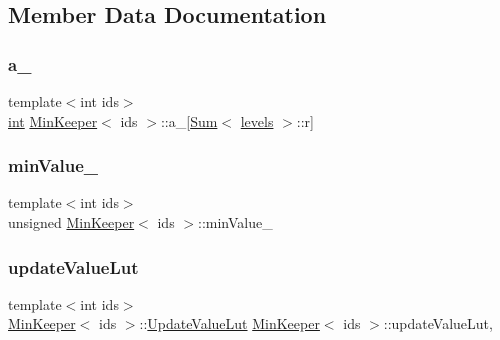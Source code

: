 \subsection{Member Data Documentation}
\mbox{\label{classMinKeeper_ac5ddfd149ad4ff5b944a98ccf4b1e6cd}} 
\subsubsection{\texorpdfstring{a\+\_\+}{a\_}}
{\footnotesize\ttfamily template$<$int ids$>$ \\
\hyperlink{ioapi_8h_a787fa3cf048117ba7123753c1e74fcd6}{int} \hyperlink{classMinKeeper}{Min\+Keeper}$<$ ids $>$\+::a\+\_\+\mbox{[}\hyperlink{structMinKeeper_1_1Sum}{Sum}$<$ \hyperlink{classMinKeeper_a745fcad4766af72248c4f26e8fb5b754aea945fa5cad053f00154ef3bf621ea51}{levels} $>$\+::r\mbox{]}\hspace{0.3cm}{\ttfamily [private]}}

\mbox{\label{classMinKeeper_a5701ef91dc989316dfa7992c19b03ca9}} 
\subsubsection{\texorpdfstring{min\+Value\+\_\+}{minValue\_}}
{\footnotesize\ttfamily template$<$int ids$>$ \\
unsigned \hyperlink{classMinKeeper}{Min\+Keeper}$<$ ids $>$\+::min\+Value\+\_\+\hspace{0.3cm}{\ttfamily [private]}}

\mbox{\label{classMinKeeper_a63181263fc50994bef542275e0962ff0}} 
\subsubsection{\texorpdfstring{update\+Value\+Lut}{updateValueLut}}
{\footnotesize\ttfamily template$<$int ids$>$ \\
\hyperlink{classMinKeeper}{Min\+Keeper}$<$ ids $>$\+::\hyperlink{classMinKeeper_1_1UpdateValueLut}{Update\+Value\+Lut} \hyperlink{classMinKeeper}{Min\+Keeper}$<$ ids $>$\+::update\+Value\+Lut\hspace{0.3cm}{\ttfamily [static]}, {\ttfamily [private]}}


